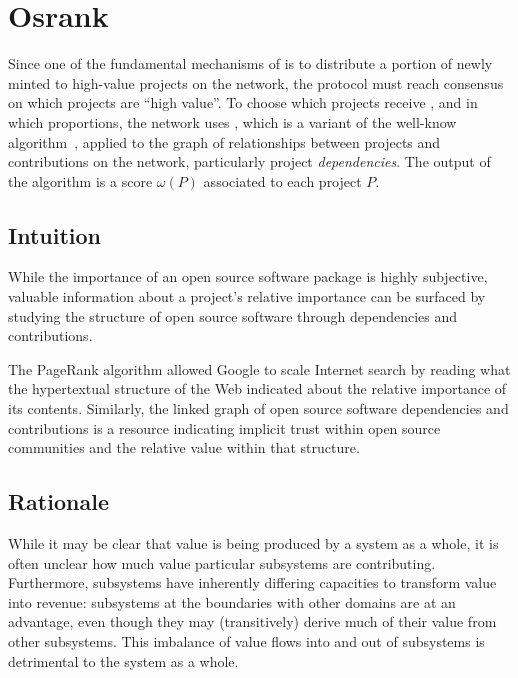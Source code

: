 \section{Osrank}
\label{s:osrank}

\def\Graph{\mathsf{Graph}}
\def\proj{\mathsf{proj}}
\def\user{\mathsf{user}}
\def\dep{\mathsf{dep}}
\def\own{\mathsf{own}}
\def\coown{\mathsf{own}^\circ}
\def\contrib{\mathsf{contrib}}
\def\cocontrib{\mathsf{contrib}^\circ}

Since one of the fundamental mechanisms of \oscoin{} is to distribute a portion
of newly minted \oscoin{} to high-value projects on the network, the protocol
must reach consensus on which projects are ``high value''. To choose which
projects receive \oscoin{}, and in which proportions, the network uses
\osrank{}, which is a variant of the well-know \pagerank{}
algorithm~\cite{pagerank}, applied to the graph of relationships between
projects and contributions on the network, particularly project
\emph{dependencies}. The output of the \osrank{} algorithm is a score
$\omega(P)$ associated to each project $P$.

\subsection{Intuition}

While the importance of an open source software package is highly subjective,
valuable information about a project's relative importance can be
surfaced by studying the structure of open source software through
dependencies and contributions.

The PageRank algorithm allowed Google to scale Internet search by
reading what the hypertextual structure of the Web indicated about the
relative importance of its contents. Similarly, the linked graph of open
source software dependencies and contributions is a resource
indicating implicit trust within open source communities and the relative
value within that structure.

\subsection{Rationale}

While it may be clear that value is being produced by a system as a whole, it is
often unclear how much value particular subsystems are
contributing. Furthermore, subsystems have inherently differing capacities to
transform value into revenue: subsystems at the boundaries with other domains
are at an advantage, even though they may (transitively) derive much of their
value from other subsystems. This imbalance of value flows into and out of
subsystems is detrimental to the system as a whole.

